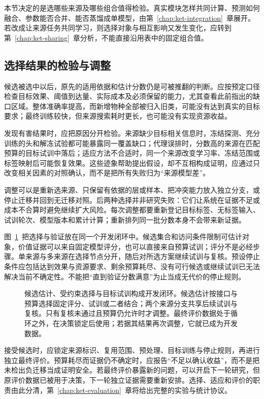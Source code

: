 本节决定的是选哪些来源及哪些组合值得检验。真实模块怎样共同计算、预测如何融合、参数能否合并、能否蒸馏成单模型，由第~\ref{chap:ket-integration}~章展开。若改成让来源任务共同学习，则选择对象与相互影响又发生变化，应转到第~\ref{chap:ket-sharing}~章分析，不能直接沿用表中的固定组合值。

\subsection{选择结果的检验与调整}
\label{sec:ket-reuse-validation}

候选被选中以后，原先的适用依据和估计分数仍是可被推翻的判断。应按预定口径检查目标效果、阈值到达量、实际成本及必须保留的能力，尤其查看此前指出的缺口区域。整体准确率提高，而新增物种全部被归入旧类，可能没有达到真实的目标要求；最终训练较快，但来源搜索耗时更长，也可能没有实现资源收益。

发现有害结果时，应把原因分开检验。来源缺少目标相关信息时，冻结探测、充分训练的头和解冻试验都可能暴露同一覆盖缺口；代理误排时，分数高的来源在匹配预算的目标试训中落后；适应方法不合适时，同一个来源改变学习率、冻结范围或标签映射后可能恢复效果。这些迹象帮助提出假设，却不互相构成证明，应通过只改变相关因素的对照确认，而不是把所有失败归为“来源模型差”。

调整可以是重新选来源、只保留有依据的层或样本、把冲突能力放入独立分支，或停止迁移并回到无迁移对照。后两种选择并非研究失败：它们让系统在证据不足或成本不合算时避免继续扩大风险。每次调整都要重新登记目标标签、无标签输入、试训轮次、模型版本和累计计算；重新排列同一批分数本身不会带来新证据。

图~\ref{fig:ket-reuse-selection-loop}~把选择与验证放在同一个开发闭环中。候选集合和访问条件限制可估计对象，价值证据可以来自固定模型评分，也可以直接来自预算试训；评分不是必经步骤。单来源与多来源在选择节点分开，随后对所选方案继续试训与复核。预设停止条件应包括达到效果与资源要求、剩余预算耗尽、没有可行候选或继续试训已无法解决当前不确定性。不能把“直到验证分数满意”为止当成无代价的停止规则。

\begin{figure}[htbp]
  \centering
  
  \caption{候选估计、受约束选择与目标试训构成开发闭环。候选估计按接口与预算选择固定评分、试训或二者结合；两个来源分支共享后续试训与复核。只有复核未通过且预算仍允许时才调整。最终评价数据处于循环之外，在决策锁定后使用；若据其结果再次调整，它就已成为开发数据。}
  \label{fig:ket-reuse-selection-loop}
\end{figure}

接受候选时，应锁定来源标识、复用范围、预处理、目标训练与停止规则，再进行独立最终评价。预算耗尽而证据仍不确定时，应报告“不足以确认收益”，而不是把未检出负迁移当成证明安全。若最终评价暴露新的问题，可以开启下一轮研究，但原评价数据已被用于决策，下一轮独立证据需要重新安排。选择、适应和评价的职责由此分清，第~\ref{chap:ket-evaluation}~章将给出完整的实验与统计协议。

